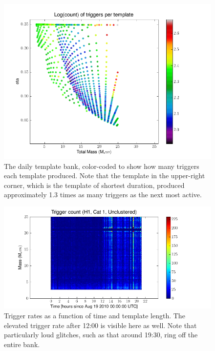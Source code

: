 \begin{figure}
  \includegraphics[width=\linewidth]{figures/detchar/H1_1_UNCLUSTERED_template_counts}
  \caption[Triggers per template]{
  \label{f:count_per_template}
The daily template bank, color-coded to show how many triggers each
template produced.  Note that the template in the upper-right corner,
which is the template of shortest duration, produced approximately 1.3
times as many triggers as the next most active.
}
\end{figure}%


\begin{figure}
  \includegraphics[width=\linewidth]{figures/detchar/H1_1_UNCLUSTERED_hexmass}
  \caption[Trigger rates as a function of time and template length]{
  \label{f:daily_ihope_time_mass}
Trigger rates as a function of time and template length.  The elevated
trigger rate after 12:00 is visible here as well.  Note that
particularly loud glitches, such as that around 19:30, ring off the
entire bank.
}
\end{figure}%


